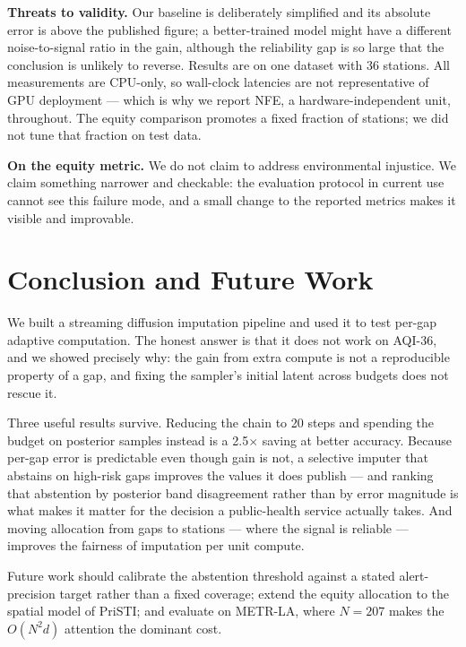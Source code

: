 \documentclass[conference]{IEEEtran}
\begin{document}
\textbf{Threats to validity.} Our baseline is deliberately simplified and its
absolute error is above the published figure; a better-trained model might have
a different noise-to-signal ratio in the gain, although the reliability gap is
so large that the conclusion is unlikely to reverse. Results are on one dataset
with 36 stations. All measurements are CPU-only, so wall-clock latencies are
not representative of GPU deployment --- which is why we report NFE, a
hardware-independent unit, throughout. The equity comparison promotes a fixed
fraction of stations; we did not tune that fraction on test data.

\textbf{On the equity metric.} We do not claim to address environmental
injustice. We claim something narrower and checkable: the evaluation protocol
in current use cannot see this failure mode, and a small change to the reported
metrics makes it visible and improvable.

\section{Conclusion and Future Work}

We built a streaming diffusion imputation pipeline and used it to test per-gap
adaptive computation. The honest answer is that it does not work on AQI-36, and
we showed precisely why: the gain from extra compute is not a reproducible
property of a gap, and fixing the sampler's initial latent across budgets does
not rescue it.

Three useful results survive. Reducing the chain to 20 steps and spending the
budget on posterior samples instead is a 2.5$\times$ saving at better accuracy.
Because per-gap error is predictable even though gain is not, a selective
imputer that abstains on high-risk gaps improves the values it does publish ---
and ranking that abstention by posterior band disagreement rather than by error
magnitude is what makes it matter for the decision a public-health service
actually takes. And moving allocation from gaps to stations --- where the
signal is reliable --- improves the fairness of imputation per unit compute.

Future work should calibrate the abstention threshold against a stated
alert-precision target rather than a fixed coverage; extend the equity allocation to the spatial model
of PriSTI; and evaluate on METR-LA, where $N=207$ makes the $O(N^2d)$ attention
the dominant cost.
\end{document}
